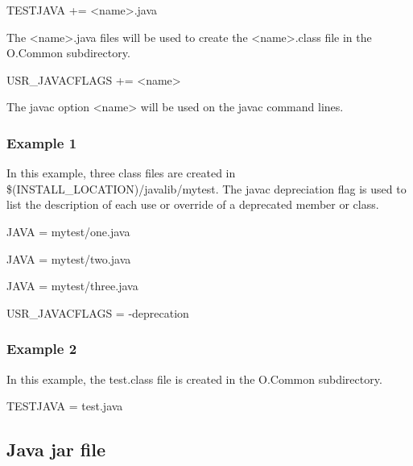 \begin{description}\item {}TESTJAVA += \textless{}name\textgreater{}.java

\end{description}The \textless{}name\textgreater{}.java files will be used to create the \textless{}name\textgreater{}.class file in the O.Common subdirectory.

\begin{description}\item {}USR\_JAVACFLAGS += \textless{}name\textgreater{}

\end{description}The javac option \textless{}name\textgreater{} will be used on the javac command lines.

\subsubsection{Example 1}

In this example, three class files are created in \$(INSTALL\_LOCATION)/javalib/mytest. The javac depreciation flag is 
used to list the description of each use or override of a deprecated member or class.

\begin{description}\item {}JAVA = mytest/one.java

\item JAVA = mytest/two.java

\item JAVA = mytest/three.java

\item {}USR\_JAVACFLAGS = -deprecation

\end{description}\subsubsection{Example 2}

In this example, the test.class file is created in the O.Common subdirectory.

\begin{description}\item {}TESTJAVA = test.java

\end{description}\subsection{Java jar file}

